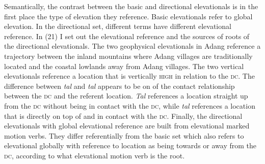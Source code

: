Semantically, the contrast between the basic and directional elevationals is in the first place the type of elevation they reference. Basic elevationals refer to global elevation. In the directional set, different terms have different elevational reference. In (21) I set out the elevational reference and the sources of roots of the directional elevationals. The two geophysical elevationals in Adang reference a trajectory between the inland mountains where Adang villages are traditionally located and the coastal lowlands away from Adang villages. The two vertical elevationals reference a location that is vertically \textsc{high} in relation to the \textsc{dc}. The difference between \textit{ta}\textit{{\textglotstop}}\textit{l}\textit{{\textepsilon}} and \textit{tal}\textit{{\textepsilon}} appears to be on of the contact relationship between the \textsc{dc} and the referent location. \textit{Ta}\textit{{\textglotstop}}\textit{l}\textit{{\textepsilon}} references a location straight up from the \textsc{dc} without being in contact with the \textsc{dc}, while \textit{tal}\textit{{\textepsilon}} references a location that is directly on top of and in contact with the \textsc{dc.} \textsc{F}inally, the directional elevationals with global elevational reference are built from elevational marked motion verbs. They differ referentially from the basic set which also refers to elevational globally with reference to location as being towards or away from the \textsc{dc}, according to what elevational motion verb is the root.




